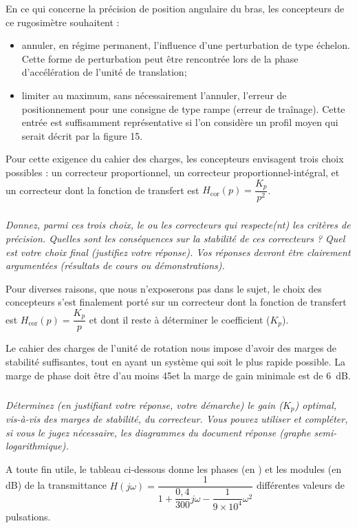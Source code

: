 En ce qui concerne la précision de position angulaire du bras, les concepteurs de ce rugosimètre
souhaitent :
\begin{itemize}
\item annuler, en régime permanent, l’influence d’une perturbation de type échelon. Cette forme de
perturbation peut être rencontrée lors de la phase d’accélération de l’unité de translation;
\item limiter au maximum, sans nécessairement l’annuler, l’erreur de positionnement pour une consigne
de type rampe (erreur de traînage). Cette entrée est suffisamment représentative si l’on considère un
profil moyen qui serait décrit par la figure 15.
\end{itemize}
Pour cette exigence du cahier des charges, les concepteurs envisagent trois choix possibles : un correcteur
proportionnel, un correcteur proportionnel-intégral, et un correcteur dont la fonction de transfert est
$H_{\text{cor}}(p) = \dfrac{K_p}{p^2}$.


\subparagraph{\label{q_12}}\textit{Donnez, parmi ces trois choix, le ou les correcteurs qui respecte(nt) les critères de précision.
Quelles sont les conséquences sur la stabilité de ces correcteurs ?
Quel est votre choix final (justifiez votre réponse).
Vos réponses devront être clairement argumentées (résultats de cours ou démonstrations).}


Pour diverses raisons, que nous n’exposerons pas dans le sujet, le choix des concepteurs s’est finalement
porté sur un correcteur dont la fonction de transfert est 
$H_{\text{cor}}(p) = \dfrac{K_p}{p}$ et dont il reste à déterminer le
coefficient ($K_p$).


Le cahier des charges de l’unité de rotation nous impose d’avoir des marges de stabilité suffisantes, tout en
ayant un système qui soit le plus rapide possible. La marge de phase doit être d’au moins 45\degres et la marge
de gain minimale est de \SI{6}{dB}.

\subparagraph{\label{q_13}}\textit{Déterminez (en justifiant votre réponse, votre démarche) le gain ($K_p$) optimal, vis-à-vis des marges de stabilité, du correcteur. Vous pouvez utiliser et compléter, si vous le jugez nécessaire, les diagrammes du document réponse (graphe semi-logarithmique).}

A toute fin utile, le tableau ci-dessous donne les phases (en \degres) et les modules (en dB) de la
transmittance  $H(j\omega )=\dfrac{1}{1+\dfrac{0,4 }{300}j\omega-\dfrac{1}{9\times 10^4}\omega^2}$
différentes valeurs de pulsations.

